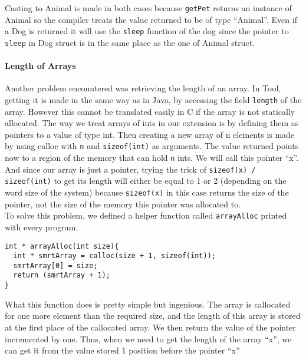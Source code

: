 Casting to Animal is made in both cases because {\lstinline[basicstyle=\small\ttfamily]|getPet|} returns an instance of Animal so the compiler treats the value returned to be of type ``Animal''. Even if a Dog is returned it will use the {\lstinline[basicstyle=\small\ttfamily]|sleep|} function of the dog since the pointer to {\lstinline[basicstyle=\small\ttfamily]|sleep|} in Dog struct is in the same place as the one of Animal struct.

\paragraph{Length of Arrays}
Another problem encountered was retrieving the length of an array. In Tool, getting it is made in the same way as in Java, by accessing the field {\lstinline[basicstyle=\small\ttfamily]|length|} of the array. However this cannot be translated easily in C if the array is not statically allocated. The way we treat arrays of ints in our extension is by defining them as pointers to a value of type int. Then creating a new array of n elements is made by using calloc with {\lstinline[basicstyle=\small\ttfamily]|n|} and {\lstinline[basicstyle=\small\ttfamily]|sizeof(int)|} as arguments. The value returned points now to a region of the memory that can hold {\lstinline[basicstyle=\small\ttfamily]|n|} ints. We will call this pointer ``x''. And since our array is just a pointer, trying the trick of {\lstinline[basicstyle=\small\ttfamily]|sizeof(x) / sizeof(int)|} to get its length will either be equal to 1 or 2 (depending on the word size of the system) because {\lstinline[basicstyle=\small\ttfamily]|sizeof(x)|} in this case returns the size of the pointer, not the size of the memory this pointer was allocated to.\\
To solve this problem, we defined a helper function called {\lstinline[basicstyle=\small\ttfamily]|arrayAlloc|} \cite{arrayLngTrick} printed with every program.

\begin{lstlisting}
int * arrayAlloc(int size){
  int * smrtArray = calloc(size + 1, sizeof(int));
  smrtArray[0] = size;
  return (smrtArray + 1);
}
\end{lstlisting}

What this function does is pretty simple but ingenious. The array is callocated for one more element than the required size, and the length of this array is stored at the first place of the callocated array. We then return the value of the pointer incremented by one. Thus, when we need to get the length of the array ``x'', we can get it from the value stored 1 position before the pointer ``x''

